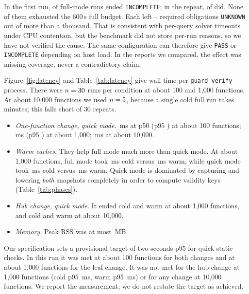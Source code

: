 \documentclass[10pt,twocolumn]{article}
\newcommand{\res}[1]{\texttt{\small #1}}
\begin{document}
In the first run, \LatFirstFullIncomplete{} of \LatFirstFullRuns{} full-mode runs ended \res{INCOMPLETE}; in the
repeat, \LatRepeatFullIncomplete{} of \LatRepeatFullRuns{} did. None of them exhausted the 600\,s full budget. Each left
\LatFullUnresolvedMin--\LatFullUnresolvedMax{} required obligations \res{UNKNOWN} out of more than a thousand. That is
consistent with per-query solver timeouts under CPU contention, but the benchmark did not store per-run reasons, so we
have not verified the cause. The same configuration can therefore give \res{PASS} or \res{INCOMPLETE} depending on host
load. In the reports we compared, the effect was missing coverage, never a contradictory claim.

Figure~\ref{fig:latency} and Table~\ref{tab:latency} give wall time per \texttt{guard verify} process. There were
$n=30$ runs per condition at about 100 and 1{,}000 functions. At about 10{,}000 functions we used
$n=5$, because a single cold full run takes minutes; this falls short of 30 repeats.

\begin{itemize}
\item \emph{One-function change, quick mode.} \LatHLeafQuickColdPfifty\,ms at p50 (p95 \LatHLeafQuickColdPninetyfive)
  at about 100 functions; \LatKLeafQuickColdPfifty\,ms (p95 \LatKLeafQuickColdPninetyfive) at about 1{,}000;
  \LatTKLeafQuickColdPfifty\,ms at about 10{,}000.
\item \emph{Warm caches.} They help full mode much more than quick mode. At about 1{,}000 functions, full mode took
  \LatKLeafFullColdPfifty\,ms cold versus \LatKLeafFullWarmPfifty\,ms warm, while quick mode took
  \LatKLeafQuickColdPfifty\,ms cold versus \LatKLeafQuickWarmPfifty\,ms warm. Quick mode is dominated by capturing and
  lowering \emph{both} snapshots completely in order to compute validity keys (Table~\ref{tab:phases}).
\item \emph{Hub change, quick mode.} It ended \LatKHubQuickColdOutcome{} cold and \LatKHubQuickWarmOutcome{} warm at about
  1{,}000 functions, and \LatTKHubQuickColdOutcome{} cold and \LatTKHubQuickWarmOutcome{} warm at about 10{,}000.
\item \emph{Memory.} Peak RSS was at most \LatMaxRss\,MB.
\end{itemize}

Our specification sets a provisional target of two seconds p95 for quick static checks. In this run it was met at about
100 functions for both changes and at about 1{,}000 functions for the leaf change. It was not met for the hub change at
1{,}000 functions (cold p95 \LatKHubQuickColdPninetyfive\,ms, warm p95 \LatKHubQuickWarmPninetyfive\,ms) or for any
change at 10{,}000 functions. We report the measurement; we do not restate the target as achieved.
\end{document}
